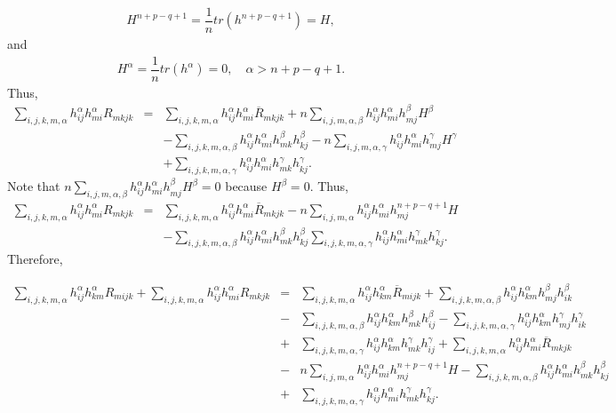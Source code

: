 \documentclass[leqno,11pt]{amsart}
\theoremstyle{plain}
\theoremstyle{definition}
\numberwithin{equation}{section}
\begin{document}
\begin{eqnarray}
H^{n+p-q+1}=\dfrac{1}{n}tr(h^{n+p-q+1})=H,
\end{eqnarray}
and 
\begin{eqnarray}
H^{\alpha}=\dfrac{1}{n}tr(h^{\alpha})=0,\quad \alpha > n+p-q+1.
\end{eqnarray}
Thus,
\begin{eqnarray}
\sum_{i,j,k,m,\alpha}h_{ij}^{\alpha}h_{mi}^{\alpha}R_{mkjk}&=&\sum_{i,j,k,m,\alpha}h_{ij}^{\alpha}h_{mi}^{\alpha}\overline{R}_{mkjk}+n\sum_{i,j,m,\alpha,\beta}h_{ij}^{\alpha}h_{mi}^{\alpha}h_{mj}^{\beta}H^{\beta} \nonumber \\
&&-\sum_{i,j,k,m,\alpha,\beta}h_{ij}^{\alpha}h_{mi}^{\alpha}h_{mk}^{\beta}h_{kj}^{\beta}-n\sum_{i,j,m,\alpha,\gamma}h_{ij}^{\alpha}h_{mi}^{\alpha}h_{mj}^{\gamma}H^{\gamma}\\
&&+\sum_{i,j,k,m,\alpha,\gamma}h_{ij}^{\alpha}h_{mi}^{\alpha}h_{mk}^{\gamma}h_{kj}^{\gamma}. \nonumber
\end{eqnarray}
Note that $n\displaystyle\sum_{i,j,m,\alpha,\beta}h_{ij}^{\alpha}h_{mi}^{\alpha}h_{mj}^{\beta}H^{\beta}=0$ because $H^{\beta}=0.$ Thus,
\begin{eqnarray}
\sum_{i,j,k,m,\alpha}h_{ij}^{\alpha}h_{mi}^{\alpha}R_{mkjk}&=&\sum_{i,j,k,m,\alpha}h_{ij}^{\alpha}h_{mi}^{\alpha}\overline{R}_{mkjk}-n\sum_{i,j,m,\alpha}h_{ij}^{\alpha}h_{mi}^{\alpha}h_{mj}^{n+p-q+1}H \nonumber \\
&& -\sum_{i,j,k,m,\alpha,\beta}h_{ij}^{\alpha}h_{mi}^{\alpha}h_{mk}^{\beta}h_{kj}^{\beta} \sum_{i,j,k,m,\alpha,\gamma}h_{ij}^{\alpha}h_{mi}^{\alpha}h_{mk}^{\gamma}h_{kj}^{\gamma}.
\end{eqnarray}
Therefore, 

\begin{eqnarray*}
\sum_{i,j,k,m,\alpha}h_{ij}^{\alpha}h_{km}^{\alpha}R_{mijk}+\sum_{i,j,k,m,\alpha}h_{ij}^{\alpha}h_{mi}^{\alpha}R_{mkjk}
&=&\sum_{i,j,k,m,\alpha}h_{ij}^{\alpha}h_{km}^{\alpha}\overline{R}_{mijk}+\sum_{i,j,k,m,\alpha,\beta}h_{ij}^{\alpha}h_{km}^{\alpha}h_{mj}^{\beta}h_{ik}^{\beta} \\&-&\sum_{i,j,k,m,\alpha,\beta}h_{ij}^{\alpha}h_{km}^{\alpha}h_{mk}^{\beta}h_{ij}^{\beta}-\sum_{i,j,k,m,\alpha,\gamma}h_{ij}^{\alpha}h_{km}^{\alpha}h_{mj}^{\gamma}h_{ik}^{\gamma}\\&+&\sum_{i,j,k,m,\alpha,\gamma}h_{ij}^{\alpha}h_{km}^{\alpha}h_{mk}^{\gamma}h_{ij}^{\gamma} + \sum_{i,j,k,m,\alpha}h_{ij}^{\alpha}h_{mi}^{\alpha}\overline{R}_{mkjk} \\
&-&n\sum_{i,j,m,\alpha}h_{ij}^{\alpha}h_{mi}^{\alpha}h_{mj}^{n+p-q+1}H - \sum_{i,j,k,m,\alpha,\beta}h_{ij}^{\alpha}h_{mi}^{\alpha}h_{mk}^{\beta}h_{kj}^{\beta}\\
&+&\sum_{i,j,k,m,\alpha,\gamma}h_{ij}^{\alpha}h_{mi}^{\alpha}h_{mk}^{\gamma}h_{kj}^{\gamma}.
\end{eqnarray*}
\end{document}
